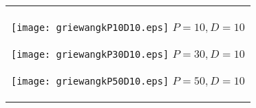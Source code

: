 \documentclass[a4paper,11pt,oneside,openany]{jsbook}
\begin{document}
\begin{figure}[htbp]
  \begin{center}
    \begin{tabular}{c}


      \begin{minipage}{0.33\hsize}
        \begin{center}
          \texttt{[image: griewangkP10D10.eps]}
          \hspace{1.2cm}$P=10, D=10
$        \end{center}
      \end{minipage}

      \begin{minipage}{0.33\hsize}
        \begin{center}
          \texttt{[image: griewangkP30D10.eps]}
          \hspace{1.2cm}$P=30, D=10
$        \end{center}
      \end{minipage}

      \begin{minipage}{0.33\hsize}
        \begin{center}
          \texttt{[image: griewangkP50D10.eps]}
          \hspace{1.2cm}$P=50, D=10
$        \end{center}
      \end{minipage}
    \end{tabular}
  \end{center}
\end{figure}
\end{document}
